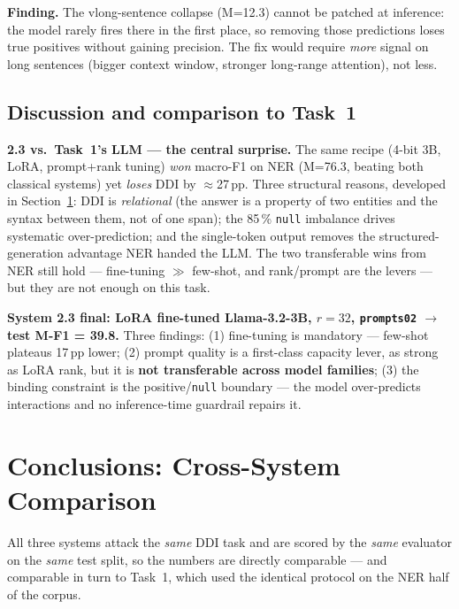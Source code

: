 \documentclass[a4paper,11pt]{article}
\begin{document}
\textbf{Finding.} The vlong-sentence collapse (M=12.3) cannot be patched
at inference: the model rarely fires there in the first place, so
removing those predictions loses true positives without gaining
precision. The fix would require \emph{more} signal on long sentences
(bigger context window, stronger long-range attention), not less.

\subsection{Discussion and comparison to Task~1}
\begin{cmpbox}\small
\textbf{2.3 vs.\ Task~1's LLM --- the central surprise.} The same recipe
(4-bit 3B, LoRA, prompt+rank tuning) \emph{won} macro-F1 on NER
(M=76.3, beating both classical systems) yet \emph{loses} DDI by
$\approx$27\,pp. Three structural reasons, developed in
Section~\ref{sec:conclusions}: DDI is \emph{relational} (the answer is a
property of two entities and the syntax between them, not of one span);
the 85\,\% \texttt{null} imbalance drives systematic over-prediction;
and the single-token output removes the structured-generation advantage
NER handed the LLM. The two transferable wins from NER still hold ---
fine-tuning $\gg$ few-shot, and rank/prompt are the levers --- but they
are not enough on this task.
\end{cmpbox}

\begin{okbox}
\textbf{System 2.3 final: LoRA fine-tuned Llama-3.2-3B, $r{=}32$,
\texttt{prompts02} $\to$ test M-F1 = 39.8.} Three findings: (1)
fine-tuning is mandatory --- few-shot plateaus 17\,pp lower; (2) prompt
quality is a first-class capacity lever, as strong as LoRA rank, but it
is \textbf{not transferable across model families}; (3) the binding
constraint is the positive/\texttt{null} boundary --- the model
over-predicts interactions and no inference-time guardrail repairs it.
\end{okbox}

\section{Conclusions: Cross-System Comparison}\label{sec:conclusions}

All three systems attack the \emph{same} DDI task and are scored by the
\emph{same} evaluator on the \emph{same} test split, so the numbers are
directly comparable --- and comparable in turn to Task~1, which used the
identical protocol on the NER half of the corpus.
\end{document}
